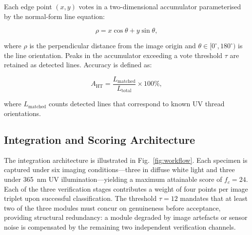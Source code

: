 \documentclass[10pt,a4paper,twocolumn,twoside]{article}
\begin{document}
Each edge point $(x, y)$ votes in a two-dimensional accumulator
parameterised by the normal-form line equation:

\begin{equation}
  \rho = x\cos\theta + y\sin\theta,
  \label{eq:hough}
\end{equation}

where $\rho$ is the perpendicular distance from the image origin
and $\theta \in [0^{\circ}, 180^{\circ})$ is the line orientation.
Peaks in the accumulator exceeding a vote threshold $\tau$ are
retained as detected lines. Accuracy is defined as:

\begin{equation}
  A_{\mathrm{HT}} =
    \frac{L_{\mathrm{matched}}}{L_{\mathrm{total}}}
    \times 100\%,
  \label{eq:ht_acc}
\end{equation}

where $L_{\mathrm{matched}}$ counts detected lines that correspond
to known UV thread orientations.

\subsection{Integration and Scoring Architecture}
\label{subsec:integration}
The integration architecture is illustrated in Fig.~\ref{fig:workflow}. Each specimen is captured under six imaging conditions---three in diffuse white light and three under 365~nm UV illumination---yielding a maximum attainable score of $f_c = 24$. Each of the three verification stages contributes a weight of four points per image triplet upon successful classification. The threshold $\tau = 12$ mandates that at least two of the three modules must concur on genuineness before acceptance, providing structural redundancy: a module degraded by image artefacts or sensor noise is compensated by the remaining two independent verification channels.
\end{document}
